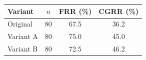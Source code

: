 \begin{tabular}{lccc}
\toprule
\textbf{Variant} & $n$ & \textbf{FRR (\%)} & \textbf{CGRR (\%)} \\
\midrule
Original & 80 & 67.5 & 36.2 \\
Variant A & 80 & 75.0 & 45.0 \\
Variant B & 80 & 72.5 & 46.2 \\
\bottomrule
\end{tabular}
